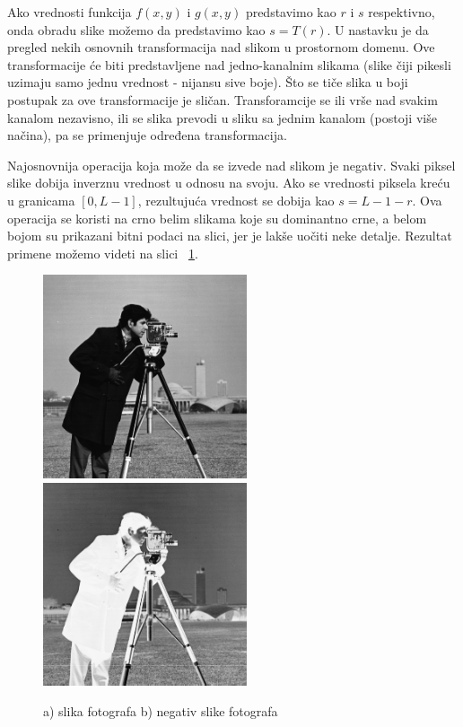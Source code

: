 \documentclass[a4paper,12pt,titlepage]{article}
\begin{document}
Ako vrednosti funkcija $f(x, y)$ i $g(x, y)$ predstavimo kao $r$ i $s$ respektivno, onda obradu slike možemo da predstavimo kao $s = T(r)$. U nastavku je da pregled nekih osnovnih transformacija nad slikom u prostornom domenu. Ove transformacije će biti predstavljene nad jedno-kanalnim slikama (slike čiji pikesli uzimaju samo jednu vrednost - nijansu sive boje). Što se tiče slika u boji postupak za ove transformacije je sličan. Transforamcije se ili vrše nad svakim kanalom nezavisno, ili se slika prevodi u sliku sa jednim kanalom (postoji više načina), pa se primenjuje određena transformacija.

Najosnovnija operacija koja može da se izvede nad slikom je negativ. Svaki piksel slike dobija inverznu vrednost u odnosu na svoju. Ako se vrednosti piksela kreću u granicama $[0, L - 1]$, rezultujuća vrednost se dobija kao $s = L - 1 - r$. Ova operacija se koristi na crno belim slikama koje su dominantno crne, a belom bojom su prikazani bitni podaci na slici, jer je lakše uočiti neke detalje. Rezultat primene možemo videti na slici ~\ref{negativ}. 

\begin{figure}[ht!]
\centering
\includegraphics[width=60mm]{img/img.png}
\includegraphics[width=60mm]{img/imgNegative.png}
\caption{a) slika fotografa b) negativ slike fotografa}
\label{negativ}
\end{figure}
\end{document}
